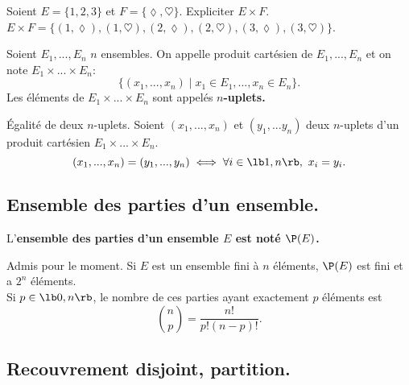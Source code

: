 \documentclass[11pt]{article}
\begin{document}
\begin{ex}{}{}
    Soient $E=\{1,2,3\}$ et $F=\{\lozenge, \heartsuit\}$. Expliciter $E\times F$.
    \tcblower
    $E\times F=\{(1,\lozenge),(1,\heartsuit),(2,\lozenge),(2,\heartsuit),(3,\lozenge),(3,\heartsuit)\}$.
\end{ex}

\begin{defi}{}{}
    Soient $E_1,...,E_n$ $n$ ensembles. On appelle produit cartésien de $E_1,...,E_n$ et on note $E_1\times...\times E_n$:
    \begin{equation*}
        \{(x_1,...,x_n) \mid x_1 \in E_1,..., x_n\in E_n\}.
    \end{equation*}
    Les éléments de $E_1\times ... \times E_n$ sont appelés $n$\bf{-uplets}.
\end{defi}

\begin{prop}{Égalité de deux $n$-uplets.}{}
    Soient $(x_1,...,x_n)$ et $(y_1,...y_n)$ deux $n$-uplets d'un produit cartésien $E_1 \times ... \times E_n$.
    \begin{equation*}
        (x_1,...,x_n) = (y_1,...,y_n) \iff \forall i \in \lb 1, n\rb,~ x_i=y_i.
    \end{equation*}
\end{prop}

\subsection{Ensemble des parties d'un ensemble.}

\begin{defi}{}{}
    L'\bf{ensemble des parties} d'un ensemble $E$ est noté $\P(E)$.
\end{defi}

\begin{prop}{Admis pour le moment.}{}
    Si $E$ est un ensemble fini à $n$ éléments, $\P(E)$ est fini et a $2^n$ éléments.\\
    Si $p\in\lb0,n\rb$, le nombre de ces parties ayant exactement $p$ éléments est
    \begin{equation*}
        \binom{n}{p}=\frac{n!}{p!(n-p)!}.
    \end{equation*}
\end{prop}

\subsection{Recouvrement disjoint, partition.}
\end{document}
